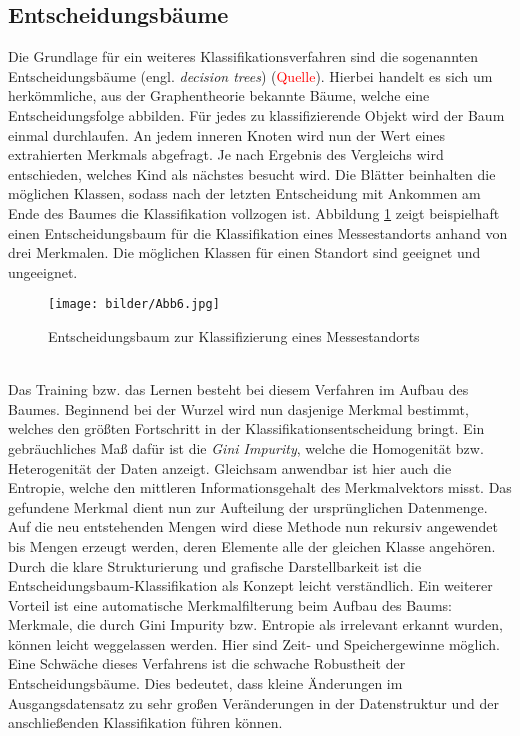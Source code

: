 \subsection{Entscheidungsbäume}
Die Grundlage für ein weiteres Klassifikationsverfahren sind die sogenannten Entscheidungsbäume (engl. \textit{decision trees}) (\textcolor{red}{Quelle}). Hierbei handelt es sich um herkömmliche, aus der Graphentheorie bekannte Bäume, welche eine Entscheidungsfolge abbilden. Für jedes zu klassifizierende Objekt wird der Baum einmal durchlaufen. An jedem inneren Knoten wird nun der Wert eines extrahierten Merkmals abgefragt. Je nach Ergebnis des Vergleichs wird entschieden, welches Kind als nächstes besucht wird. Die Blätter beinhalten die möglichen Klassen, sodass nach der letzten Entscheidung mit Ankommen am Ende des Baumes die Klassifikation vollzogen ist. Abbildung \ref{dtree} zeigt beispielhaft einen Entscheidungsbaum für die Klassifikation eines Messestandorts anhand von drei Merkmalen. Die möglichen Klassen für einen Standort sind \glqq geeignet\grqq{} und \glqq ungeeignet\grqq{}.
\begin{figure}[htb]
	\begin{center}
		\texttt{[image: bilder/Abb6.jpg]}
		\caption{Entscheidungsbaum zur Klassifizierung eines Messestandorts}\label{dtree}
	\end{center}
\end{figure}\\
Das Training bzw. das Lernen besteht bei diesem Verfahren im Aufbau des Baumes. Beginnend bei der Wurzel wird nun dasjenige Merkmal bestimmt, welches den größten Fortschritt in der Klassifikationsentscheidung bringt. Ein gebräuchliches Maß dafür ist die \textit{Gini Impurity}, welche die Homogenität bzw. Heterogenität der Daten anzeigt. Gleichsam anwendbar ist hier auch die Entropie, welche den mittleren Informationsgehalt des Merkmalvektors misst. Das gefundene Merkmal dient nun zur Aufteilung der ursprünglichen Datenmenge. Auf die neu entstehenden Mengen wird diese Methode nun rekursiv angewendet bis Mengen erzeugt werden, deren Elemente alle der gleichen Klasse angehören.\\
Durch die klare Strukturierung und grafische Darstellbarkeit ist die Entscheidungsbaum-Klassifikation als Konzept leicht verständlich. Ein weiterer Vorteil ist eine automatische Merkmalfilterung beim Aufbau des Baums: Merkmale, die durch Gini Impurity bzw. Entropie als irrelevant erkannt wurden, können leicht weggelassen werden. Hier sind Zeit- und Speichergewinne möglich.\\
Eine Schwäche dieses Verfahrens ist die schwache Robustheit der Entscheidungsbäume. Dies bedeutet, dass kleine Änderungen im Ausgangsdatensatz zu sehr großen Veränderungen in der Datenstruktur und der anschließenden Klassifikation führen können.
